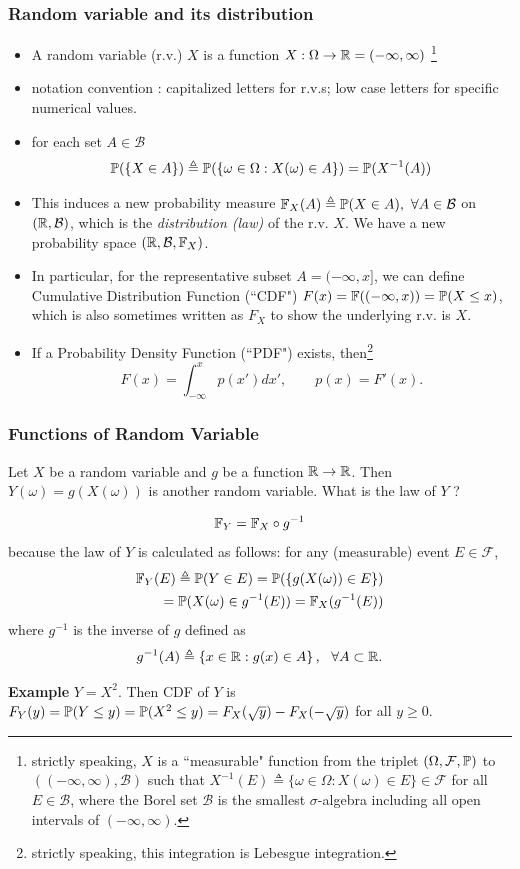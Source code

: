 \documentclass[english,10pt,handout]{beamer}
\begin{document}
\begin{frame}
\frametitle{Random variable and its distribution}
\begin{itemize}[<+->]
\item
A random variable (r.v.) $X$ is a function  $X: \Omega \to  {\mathbb{R}} =(-\infty,\infty)$
\footnote{strictly speaking,   $X$  is a ``measurable" function from the triplet $(\Omega,\mathcal{F},\mathbb{P})$ to
 $ ((-\infty,\infty), \mathcal{B})$ such that $X^{-1}(E)\triangleq\{\omega\in \Omega: X(\omega)\in E\} \in \mathcal{F}$
for all $E\in \mathcal{B}$, where the Borel set $\mathcal{B}$
is the smallest $\sigma$-algebra including all open intervals of $(-\infty,\infty)$.}

\item notation convention : capitalized letters for r.v.s; low case letters for specific numerical values. 

\item for each set   $A\in \mathcal{B}$
\[\mathbb{P}(  \{X\in A \} ) \triangleq \mathbb{P}(\{\omega\in\Omega:  X(\omega)\in A\})=\mathbb{P}(X^{-1}(A))\]
\item 
This induces a new probability measure 
${\mathbb{F}}_X(A)\triangleq\mathbb{P}(X \in A),\ \forall A\in \mathcal{B}$ on $({\mathbb{R}}, \mathcal{B})$, which is the {\em distribution (law)}
of the r.v. $X$.  We have a new probability space $({\mathbb{R}}, \mathcal{B}, {\mathbb{F}}_X)$.

\item In particular, for the representative subset $A=(-\infty,x]$, 
we can define
Cumulative Distribution Function (``CDF")
$F(x)={\mathbb{F}}((-\infty,x))=\mathbb{P}(X\leq x)$,
which is also sometimes written as $F_X$ to show the underlying r.v. is $X$.

\item If a Probability Density Function (``PDF") exists, then\footnote{strictly speaking, this integration is Lebesgue integration.}
\[F(x)=\int_{-\infty}^x p(x')dx',\qquad p(x)=F'(x).\]
\end{itemize} 
\end{frame}



\begin{frame}
\frametitle{Functions of Random Variable}
Let $X$ be a random variable and $g$ be a function ${\mathbb{R}}\to{\mathbb{R}}$. 
Then $Y(\omega)=g(X(\omega))$ is another random variable.
What is the law of $Y$ ? 

\pause
$${\mathbb{F}}_Y = {\mathbb{F}}_X \circ g^{-1}$$
because the law of $Y$ is calculated as follows: for any (measurable) event $E\in \mathcal{F}$,
\[
\begin{split}
{\mathbb{F}}_Y(E)\triangleq \mathbb{P}(Y\in E)=\mathbb{P}(\{g(X(\omega))\in E \})
\\
=\mathbb{P}(X(\omega)\in g^{-1}(E))={\mathbb{F}}_X(g^{-1}(E))
\end{split}\]
where  $g^{-1}$ is the inverse of $g$ defined as 
\[g^{-1}(A) \triangleq \left\{x\in {\mathbb{R}}:  g(x)\in A \right\}, ~~\forall A\subset {\mathbb{R}}.\]
\pause 

\medskip

{\bf Example}
$Y=X^2$. Then CDF of $Y$ is 
$F_Y(y)=\mathbb{P}(Y\leq y)=\mathbb{P}(X^2\leq y) = F_X(\sqrt{y})-F_X(-\sqrt{y})$
for all $y\geq 0$.
\\

\medskip 
\end{frame}
\end{document}

